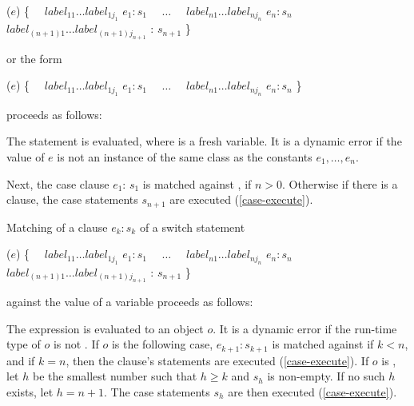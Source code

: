 \documentclass[makeidx]{article}
\begin{document}
{\begin{normativeDartCode}
\SWITCH{} ($e$) \{
\ \ $label_{11} \ldots label_{1j_1}$ \CASE{} $e_1: s_1$
\ \ $\ldots$
\ \ $label_{n1} \ldots label_{nj_n}$ \CASE{} $e_n: s_n$
\ \ $label_{(n+1)1} \ldots label_{(n+1)j_{n+1}}$ \DEFAULT{}: $s_{n+1}$
\}
\end{normativeDartCode}

or the form

\begin{normativeDartCode}
\SWITCH{} ($e$) \{
\ \ $label_{11} \ldots label_{1j_1}$ \CASE{} $e_1: s_1$
\ \ $\ldots$
\ \ $label_{n1} \ldots label_{nj_n}$ \CASE{} $e_n: s_n$
\}
\end{normativeDartCode}

proceeds as follows:

\LMHash{}%
The statement  is evaluated, where \id{} is a fresh variable.
It is a dynamic error if the value of $e$ is
not an instance of the same class as the constants $e_1, \ldots, e_n$.


\LMHash{}%
Next, the case clause \CASE{} $e_{1}$: $s_{1}$ is matched against \id, if $n > 0$.
Otherwise if there is a \DEFAULT{} clause, the case statements $s_{n+1}$ are executed (\ref{case-execute}).

\LMHash{}%
Matching of a \CASE{} clause \CASE{} $e_{k}: s_{k}$ of a switch statement

\begin{normativeDartCode}
\SWITCH{} ($e$) \{
\ \ $label_{11} \ldots label_{1j_1}$ \CASE{} $e_1: s_1$
\ \ $\ldots$
\ \ $label_{n1} \ldots label_{nj_n}$ \CASE{} $e_n: s_n$
\ \ $label_{(n+1)1} \ldots label_{(n+1)j_{n+1}}$ \DEFAULT{}: $s_{n+1}$
\}
\end{normativeDartCode}

against the value of a variable \id{} proceeds as follows:

\LMHash{}%
The expression  is evaluated to an object $o$.
It is a dynamic error if the run-time type of $o$ is not .
If $o$ is \FALSE{} the following case, \CASE{} $e_{k+1}: s_{k+1}$ is matched against \id{} if $k < n$, and if $k = n$, then the \DEFAULT{} clause's statements are executed (\ref{case-execute}).
If $o$ is \TRUE{}, let $h$ be the smallest number such that $h \ge k$ and $s_h$ is non-empty.
If no such $h$ exists, let $h = n + 1$.
The case statements $s_h$ are then executed (\ref{case-execute}).

}
\end{document}
